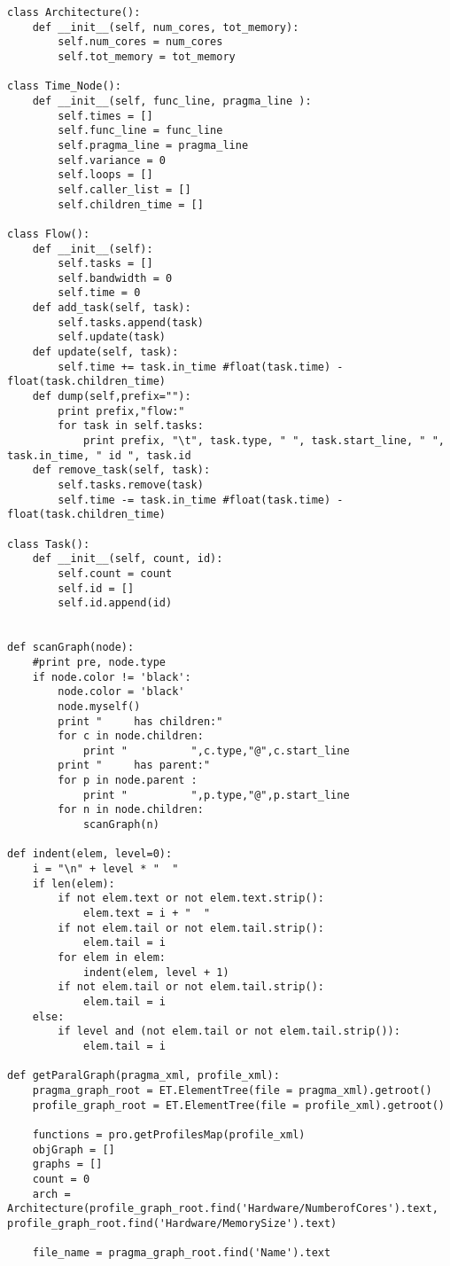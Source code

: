 \documentclass[a4paper,10pt,twoside]{book}
\begin{document}
\begin{lstlisting}[language=CCC, caption=pargraph.py]
class Architecture():
	def __init__(self, num_cores, tot_memory):
		self.num_cores = num_cores
		self.tot_memory = tot_memory

class Time_Node():
	def __init__(self, func_line, pragma_line ):
		self.times = []
		self.func_line = func_line
		self.pragma_line = pragma_line
		self.variance = 0
		self.loops = []
		self.caller_list = []
		self.children_time = []

class Flow():
	def __init__(self):
		self.tasks = []
		self.bandwidth = 0
		self.time = 0
	def add_task(self, task):
		self.tasks.append(task)
		self.update(task)
	def update(self, task):
		self.time += task.in_time #float(task.time) - float(task.children_time)
	def dump(self,prefix=""):
		print prefix,"flow:"
		for task in self.tasks:
			print prefix, "\t", task.type, " ", task.start_line, " ", task.in_time, " id ", task.id
	def remove_task(self, task):
		self.tasks.remove(task)
		self.time -= task.in_time #float(task.time) - float(task.children_time)

class Task():
	def __init__(self, count, id):
		self.count = count
		self.id = []
		self.id.append(id)


def scanGraph(node):
	#print pre, node.type
	if node.color != 'black':
		node.color = 'black'
		node.myself()
		print "     has children:"
		for c in node.children:
			print "          ",c.type,"@",c.start_line
		print "     has parent:"
		for p in node.parent :
			print "          ",p.type,"@",p.start_line
		for n in node.children:
			scanGraph(n)

def indent(elem, level=0):
    i = "\n" + level * "  "
    if len(elem):
        if not elem.text or not elem.text.strip():
            elem.text = i + "  "
        if not elem.tail or not elem.tail.strip():
            elem.tail = i
        for elem in elem:
            indent(elem, level + 1)
        if not elem.tail or not elem.tail.strip():
            elem.tail = i
    else:
        if level and (not elem.tail or not elem.tail.strip()):
            elem.tail = i

def getParalGraph(pragma_xml, profile_xml):
	pragma_graph_root = ET.ElementTree(file = pragma_xml).getroot()
	profile_graph_root = ET.ElementTree(file = profile_xml).getroot()

	functions = pro.getProfilesMap(profile_xml)
	objGraph = []
	graphs = []
	count = 0
	arch = Architecture(profile_graph_root.find('Hardware/NumberofCores').text, profile_graph_root.find('Hardware/MemorySize').text)

	file_name = pragma_graph_root.find('Name').text


\end{lstlisting}
\end{document}
